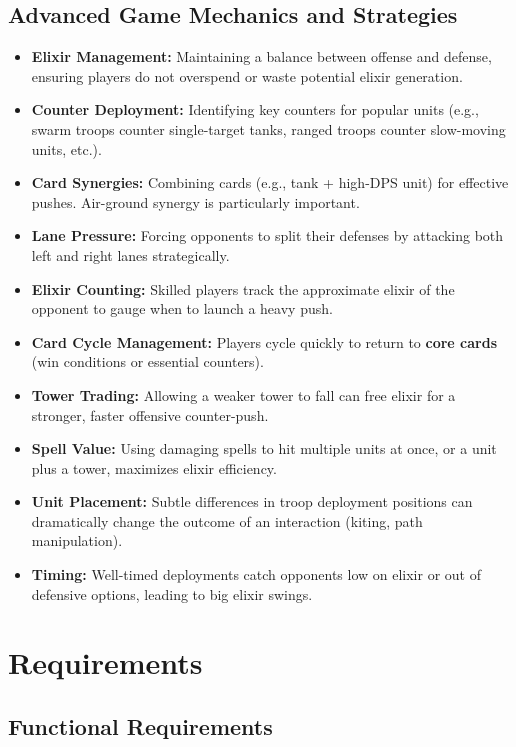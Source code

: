 \documentclass{article}
\begin{document}
\subsection{Advanced Game Mechanics and Strategies}
\begin{itemize}
    \item \textbf{Elixir Management:} Maintaining a balance between offense and defense, ensuring players do not overspend or waste potential elixir generation.
    \item \textbf{Counter Deployment:} Identifying key counters for popular units (e.g., swarm troops counter single-target tanks, ranged troops counter slow-moving units, etc.).
    \item \textbf{Card Synergies:} Combining cards (e.g., tank + high-DPS unit) for effective pushes. Air-ground synergy is particularly important.
    \item \textbf{Lane Pressure:} Forcing opponents to split their defenses by attacking both left and right lanes strategically.
    \item \textbf{Elixir Counting:} Skilled players track the approximate elixir of the opponent to gauge when to launch a heavy push.
    \item \textbf{Card Cycle Management:} Players cycle quickly to return to \textbf{core cards} (win conditions or essential counters).
    \item \textbf{Tower Trading:} Allowing a weaker tower to fall can free elixir for a stronger, faster offensive counter-push.
    \item \textbf{Spell Value:} Using damaging spells to hit multiple units at once, or a unit plus a tower, maximizes elixir efficiency.
    \item \textbf{Unit Placement:} Subtle differences in troop deployment positions can dramatically change the outcome of an interaction (kiting, path manipulation).
    \item \textbf{Timing:} Well-timed deployments catch opponents low on elixir or out of defensive options, leading to big elixir swings.
\end{itemize}

\newpage

\section{Requirements}

\subsection{Functional Requirements}
\end{document}
